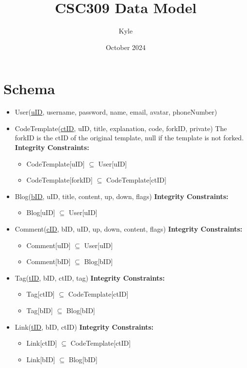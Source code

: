 \documentclass{article}
\title{CSC309 Data Model}
\author{Kyle}
\date{October 2024}
\begin{document}
\maketitle

\section*{Schema}

\begin{itemize}
\item
User(\underline{uID}, username, password, name, email, avatar, phoneNumber)

\item
CodeTemplate(\underline{ctID}, uID, title, explanation, code, forkID, private)
The forkID is the ctID of the original template, null if the template is not forked.
\textbf{Integrity Constraints:}
\begin{itemize}
\item CodeTemplate[uID] $\subseteq$ User[uID]
\item CodeTemplate[forkID] $\subseteq$ CodeTemplate[ctID]
\end{itemize}

\item
Blog(\underline{bID}, uID, title, content, up, down, flags)
\textbf{Integrity Constraints:}
\begin{itemize}
\item Blog[uID] $\subseteq$ User[uID]
\end{itemize}

\item
Comment(\underline{cID}, bID, uID, up, down, content, flags)
\textbf{Integrity Constraints:}
\begin{itemize}
\item Comment[uID] $\subseteq$ User[uID]
\item Comment[bID] $\subseteq$ Blog[bID]
\end{itemize}

\item
Tag(\underline{tID}, bID, ctID, tag)
\textbf{Integrity Constraints:}
\begin{itemize}
\item Tag[ctID] $\subseteq$ CodeTemplate[ctID]
\item Tag[bID] $\subseteq$ Blog[bID]
\end{itemize}

\item
Link(\underline{tID}, bID, ctID)
\textbf{Integrity Constraints:}
\begin{itemize}
\item Link[ctID] $\subseteq$ CodeTemplate[ctID]
\item Link[bID] $\subseteq$ Blog[bID]
\end{itemize}


\end{itemize}
\end{document}
